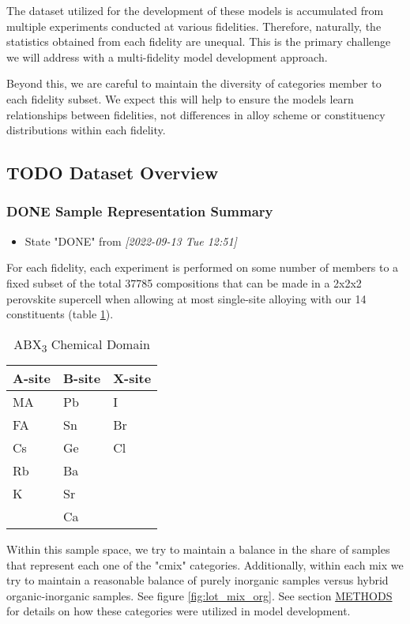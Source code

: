 \documentclass[aip, jmp, amsmath, amssymb]{revtex4-2}
\begin{document}
The dataset utilized for the development of these models is
accumulated from multiple experiments conducted at various
fidelities. Therefore, naturally, the statistics obtained from each
fidelity are unequal. This is the primary challenge we will address
with a multi-fidelity model development approach.

Beyond this, we are careful to maintain the diversity of categories
member to each fidelity subset. We expect this will help to ensure the
models learn relationships between fidelities, not differences in
alloy scheme or constituency distributions within each fidelity.

\subsection*{{\bfseries\sffamily TODO} Dataset Overview}
\label{sec:orgdc852cc}
\subsubsection*{{\bfseries\sffamily DONE} Sample Representation Summary}
\label{sec:orgddb2c7f}
\begin{itemize}
\item State "DONE"       from              \textit{[2022-09-13 Tue 12:51]}
\end{itemize}
For each fidelity, each experiment is performed on some number of
members to a fixed subset of the total 37785 compositions that can be
made in a 2x2x2 perovskite supercell when allowing at most single-site
alloying with our 14 constituents (table \ref{tbl:site_tbl}).

\begin{table}[htbp]
\caption{\label{tbl:site_tbl} ABX\textsubscript{3} Chemical Domain}
\centering
\begin{tabular}{lll}
A-site & B-site & X-site\\
\hline
MA & Pb & I\\
FA & Sn & Br\\
Cs & Ge & Cl\\
Rb & Ba & \\
K & Sr & \\
 & Ca & \\
\end{tabular}
\end{table}

Within this sample space, we try to maintain a balance in the share of
samples that represent each one of the "\gls{cmix}"
categories. Additionally, within each mix we try to maintain a
reasonable balance of purely inorganic samples versus hybrid
organic-inorganic samples. See figure \ref{fig:lot_mix_org}. See section
\hyperref[sec:org9b441ac]{METHODS} for details on how these categories were utilized in model
development.
\end{document}
